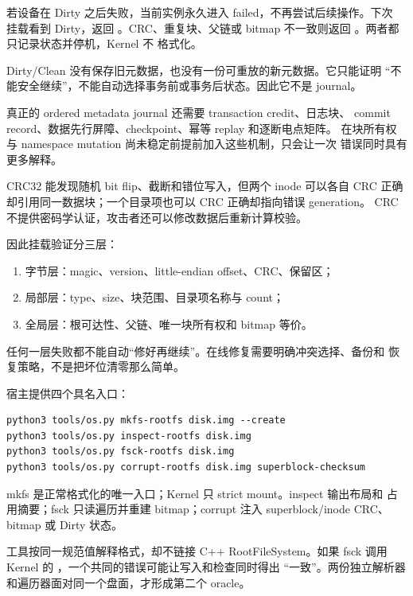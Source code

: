 若设备在 Dirty 之后失败，当前实例永久进入 failed，不再尝试后续操作。下次
挂载看到 Dirty，返回 。CRC、重复块、父链或
bitmap 不一致则返回 。两者都只记录状态并停机，Kernel 不
格式化。

\begin{failurebox}
Dirty/Clean 没有保存旧元数据，也没有一份可重放的新元数据。它只能证明
“不能安全继续”，不能自动选择事务前或事务后状态。因此它不是 journal。
\end{failurebox}

真正的 ordered metadata journal 还需要 transaction credit、日志块、
commit record、数据先行屏障、checkpoint、幂等 replay 和逐断电点矩阵。
在块所有权与 namespace mutation 尚未稳定前提前加入这些机制，只会让一次
错误同时具有更多解释。

CRC32 能发现随机 bit flip、截断和错位写入，但两个 inode 可以各自 CRC
正确却引用同一数据块；一个目录项也可以 CRC 正确却指向错误 generation。
CRC 不提供密码学认证，攻击者还可以修改数据后重新计算校验。

因此挂载验证分三层：

\begin{enumerate}
  \item 字节层：magic、version、little-endian offset、CRC、保留区；
  \item 局部层：type、size、块范围、目录项名称与 count；
  \item 全局层：根可达性、父链、唯一块所有权和 bitmap 等价。
\end{enumerate}

任何一层失败都不能自动“修好再继续”。在线修复需要明确冲突选择、备份和
恢复策略，不是把坏位清零那么简单。

宿主提供四个具名入口：

\begin{lstlisting}[caption={rootfs v2 独立工具}]
python3 tools/os.py mkfs-rootfs disk.img --create
python3 tools/os.py inspect-rootfs disk.img
python3 tools/os.py fsck-rootfs disk.img
python3 tools/os.py corrupt-rootfs disk.img superblock-checksum
\end{lstlisting}

mkfs 是正常格式化的唯一入口；Kernel 只 strict mount。inspect 输出布局和
占用摘要；fsck 只读遍历并重建 bitmap；corrupt 注入 superblock/inode CRC、
bitmap 或 Dirty 状态。

工具按同一规范值解释格式，却不链接 C++ RootFileSystem。如果 fsck 调用
Kernel 的 ，一个共同的错误可能让写入和检查同时得出
“一致”。两份独立解析器和遍历器面对同一个盘面，才形成第二个 oracle。


